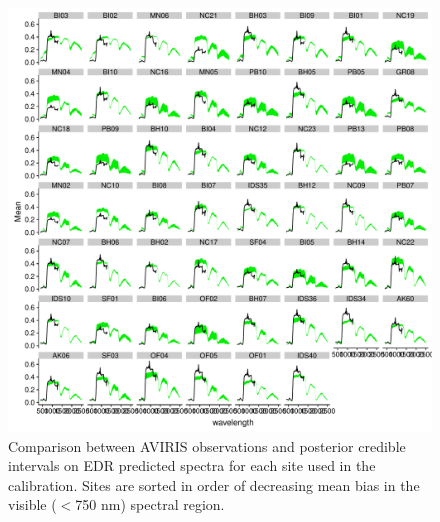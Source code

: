 \begin{figure}
  \centering
  \includegraphics[width=\textwidth]{4_edr/figures/explore_spectra/errors_byvis_all.pdf}
  \caption{%
    Comparison between AVIRIS observations and posterior credible intervals on EDR predicted spectra for each site used in the calibration.
    Sites are sorted in order of decreasing mean bias in the visible ($<$750 nm) spectral region.
  }\label{fig:spec_error_all}
\end{figure}

